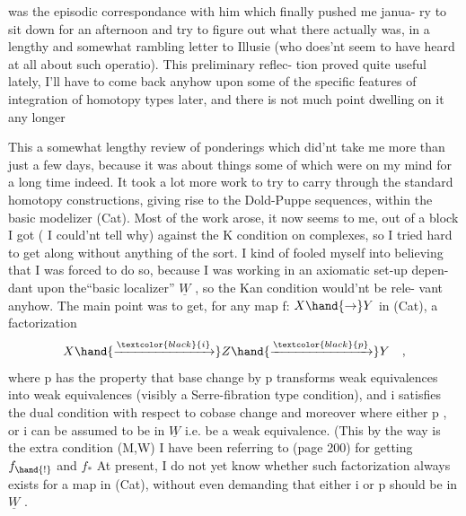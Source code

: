 was the episodic correspondance with him which finally pushed me   janua-%
ry to sit down for an afternoon and try to figure out what there actually
was, in a lengthy and somewhat rambling letter to Illusie (who does'nt
seem to have heard at all about such operatio). This preliminary reflec-%
tion proved quite useful lately, I'll have to come back anyhow upon some
of the specific features of integration of homotopy types later, and there
is not much point dwelling on it any longer  

 This  a \hand{(} somewhat lengthy\hand{!)} review of ponderings which did'nt take me
more than just a few days, because it was about things some of which were
on my mind for a long time indeed. It took  a lot more work to try to
carry through the standard homotopy constructions, giving rise to the
Dold-Puppe sequences, within the basic modelizer (Cat). Most of the work
arose, it now seems to me, out of a block I got ( I could'nt tell why)
against the K condition on complexes, so I tried hard to get along
without anything of the sort. I kind of fooled myself into believing that
I was forced to do so, because I was working in an axiomatic set-up depen-%
dant upon the``basic localizer'' $\underline{W}$ , so the Kan condition would'nt be rele-%
vant anyhow. The main point was to get, for any map f: $X \hand{\to} Y$ in (Cat),
a factorization
\[ X \hand{\xrightarrow{\textcolor{black}{i}}} Z \hand{\xrightarrow{\textcolor{black}{p}}} Y \quad , \]
where p has the property that base change by p transforms weak equivalences
into weak equivalences\hand{,}  (visibly a Serre-fibration type condition),
and i satisfies the dual condition with respect to co\hand{-}base change\hand{;} and
moreover where either p , or i can be assumed to be in $\underline{W}$ i.e.  be a weak
equivalence. (This\hand{,} by the way\hand{,} is the extra condition  (M,W) I
have been referring to   (page 200)\deleted{\unsure{)}}\hand{,} for  getting $f_{\hand{!}}$ and $f_{*}$ 
At present, I do not yet know whether such factorization  always
exists for a map in (Cat), without even  demanding that either i
or p should be in $\underline{W}$ . \hand{$\Vert$}

